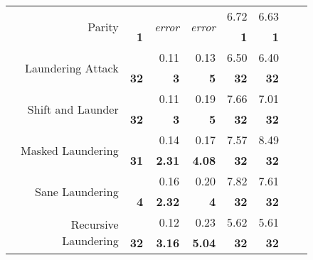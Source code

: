\begin{figure}
\begin{table}[H]
\begin{tabular}{rr|rr|rr|rr}
\multirow{2}{*}{Parity}               &               & \multirow{2}{*}{\textit{error\footnotemark[2]}} & \multirow{2}{*}{\textit{error}\footnotemark[2]} & 6.72          & 6.63         &                &               \\
                                      & \textbf{1}    &                        &                        & \textbf{1}    & \textbf{1}   &                &               \\ \hline
\multirow{2}{*}{Laundering Attack}    &               & 0.11                   & 0.13                   & 6.50          & 6.40         &                &               \\
                                      & \textbf{32}   & \textbf{3}             & \textbf{5}             & \textbf{32}   & \textbf{32}  &                &               \\ \hline
\multirow{2}{*}{Shift and Launder}    &               & 0.11                   & 0.19                   & 7.66          & 7.01         &                &               \\
                                      & \textbf{32}   & \textbf{3}             & \textbf{5}             & \textbf{32}   & \textbf{32}  &                &               \\ \hline
\multirow{2}{*}{Masked Laundering}    &               & 0.14                   & 0.17                   & 7.57          & 8.49         &                &               \\
                                      & \textbf{31}   & \textbf{2.31}          & \textbf{4.08}          & \textbf{32}   & \textbf{32}  &                &               \\ \hline
\multirow{2}{*}{Sane Laundering}      &               & 0.16                   & 0.20                   & 7.82          & 7.61         &                &               \\
                                      & \textbf{4}    & \textbf{2.32}          & \textbf{4}             & \textbf{32}   & \textbf{32}  &                &               \\ \hline\hline
\multirow{2}{*}{Recursive Laundering} &               & 0.12                   & 0.23                   & 5.62          & 5.61         &                &               \\
                                      & \textbf{32}   & \textbf{3.16}          & \textbf{5.04}          & \textbf{32}   & \textbf{32}  &                &               \\ \hline

\end{tabular}
\end{table}
\end{figure}
